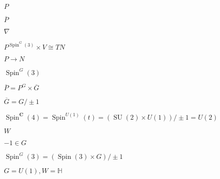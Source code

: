 \begin{preview}
\setcounter{equation}{0}%
\( P \)
\end{preview}

\begin{preview}
\setcounter{equation}{0}%
\( \overline{P} \)
\end{preview}

\begin{preview}
\setcounter{equation}{0}%
\( \nabla  \)
\end{preview}

\begin{preview}
\setcounter{equation}{0}%
\( P^{\operatorname{Spin}^G(3)} \times  V \cong TN \)
\end{preview}

\begin{preview}
\setcounter{equation}{0}%
\( P \to N \)
\end{preview}

\begin{preview}
\setcounter{equation}{0}%
\( \operatorname{Spin}^G(3) \)
\end{preview}

\begin{preview}
\setcounter{equation}{0}%
\( \overline{P} = P^G \times \overline{G} \)
\end{preview}

\begin{preview}
\setcounter{equation}{0}%
\( \overline{G} = G / \pm 1 \)
\end{preview}

\begin{preview}
\setcounter{equation}{0}%
\( \operatorname{Spin}^{\mathbf{C}}(4) = \operatorname{Spin}^{U(1)}(t) = \left( \operatorname{SU}(2) \times U(1) \right)/ \pm 1 = U(2) \)
\end{preview}

\begin{preview}
\setcounter{equation}{0}%
\( W \)
\end{preview}

\begin{preview}
\setcounter{equation}{0}%
\( -1\in G \)
\end{preview}

\begin{preview}
\setcounter{equation}{0}%
\( \operatorname{Spin}^G(3) = \left( \operatorname{Spin}(3) \times  G \right) / \pm 1 \)
\end{preview}

\begin{preview}
\setcounter{equation}{0}%
\( G = U(1), W = \mathbb{H} \)
\end{preview}

